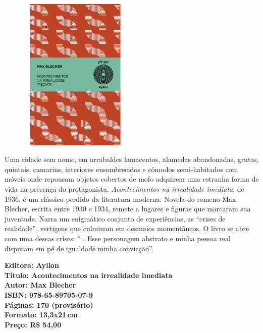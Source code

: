 \pagebreak

\begin{center}
\hspace*{.5cm}\includegraphics[width=74mm]{./grid/blecher.jpg}
\end{center}

\hspace*{-7cm}\hrulefill\hspace*{-7cm}

\medskip

\noindent{}Uma cidade sem nome, em arrabaldes lamacentos, alamedas abandonadas, grutas, quintais, camarins, interiores ensombrecidos e cômodos semi-habitados com móveis onde repousam objetos cobertos de mofo adquirem uma estranha forma de vida na presença do protagonista.
\textit{Acontecimentos na irrealidade imediata}, de 1936, é um clássico perdido da literatura moderna. Novela do romeno Max Blecher, escrita entre 1930 e 1934, remete a lugares e figuras que marcaram sua juventude. Narra um enigmático conjunto de experiências, as ``crises de realidade'', vertigens que culminam em desmaios momentâneos. O livro se abre com uma dessas crises: `` . Esse personagem abstrato e minha pessoa real disputam em pé de igualdade minha convicção''.
\vfill

\noindent\begin{minipage}[c]{1\linewidth}
{\small\textbf{
\hspace*{-.1cm}Editora: Ayllon\\
Título: Acontecimentos na irrealidade imediata\\
Autor: Max Blecher\\ 
ISBN: 978-65-89705-07-9\\
Páginas: 170 (provisório)\\
Formato: 13,3x21\,cm\\
Preço: R\$ 54,00\\
}}
\end{minipage}

